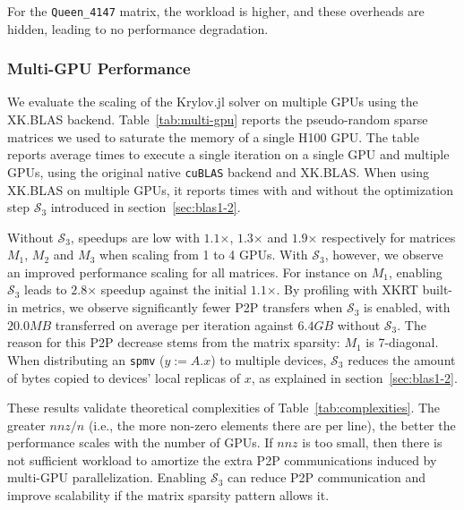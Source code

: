 \documentclass{juliacon}
\begin{document}
For the \texttt{Queen\_4147} matrix, the workload is higher, and these overheads are hidden, leading to no performance degradation.


\subsubsection{Multi-GPU Performance}

We evaluate the scaling of the Krylov.jl solver on multiple GPUs using the XK.BLAS backend.
Table~\ref{tab:multi-gpu} reports the pseudo-random sparse matrices we used to saturate the memory of a single H100 GPU.
The table reports average times to execute a single iteration on a single GPU and multiple GPUs, using the original native \texttt{cuBLAS} backend and XK.BLAS.
When using XK.BLAS on multiple GPUs, it reports times with and without the optimization step $\mathcal{S}_3$ introduced in section~\ref{sec:blas1-2}.

Without $\mathcal{S}_3$, speedups are low with $1.1$×, $1.3$× and $1.9$× respectively for matrices $M_1$, $M_2$ and $M_3$ when scaling from 1 to 4 GPUs.
With $\mathcal{S}_3$, however, we observe an improved performance scaling for all matrices.
For instance on $M_1$, enabling $\mathcal{S}_3$ leads to $2.8$× speedup against the initial $1.1$×.
By profiling with XKRT built-in metrics, we observe significantly fewer P2P transfers when $\mathcal{S}_3$ is enabled, with $20.0MB$ transferred on average per iteration against $6.4GB$ without $\mathcal{S}_3$.
The reason for this P2P decrease stems from the matrix sparsity: $M_1$ is 7-diagonal.
When distributing an \texttt{spmv} ($y := A.x$) to multiple devices, $\mathcal{S}_3$ reduces the amount of bytes copied to devices' local replicas of $x$, as explained in section~\ref{sec:blas1-2}.

These results validate theoretical complexities of Table~\ref{tab:complexities}.
The greater $nnz/n$ (i.e., the more non-zero elements there are per line), the better the performance scales with the number of GPUs.
If $nnz$ is too small, then there is not sufficient workload to amortize the extra P2P communications induced by multi-GPU parallelization.
Enabling $\mathcal{S}_3$ can reduce P2P communication and improve scalability if the matrix sparsity pattern allows it.
\end{document}
